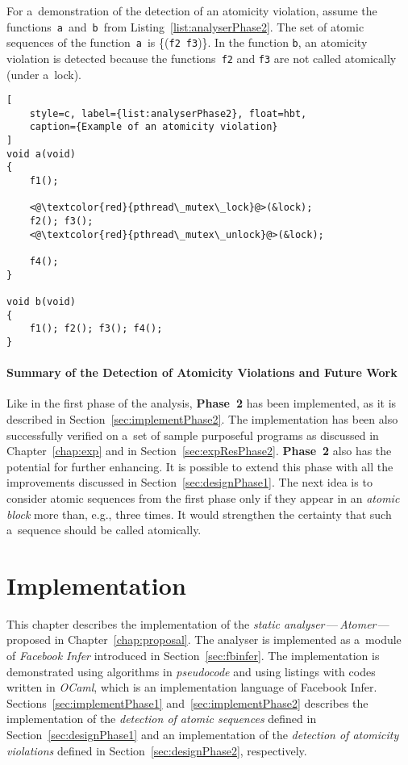 \begin{example}
    For a~demonstration of the detection of an atomicity violation, assume
    the functions~\texttt{a}~and~\texttt{b}~from
    Listing~\ref{list:analyserPhase2}. The set of atomic sequences of the
    function~\texttt{a}~is \{(\texttt{f2}~\texttt{f3})\}. In the function
    \texttt{b}, an atomicity violation is detected because the
    functions~\texttt{f2} and \texttt{f3} are not called atomically (under
    a~lock).
\end{example}

\begin{lstlisting}[
    style=c, label={list:analyserPhase2}, float=hbt,
    caption={Example of an atomicity violation}
]
void a(void)
{
    f1();

    <@\textcolor{red}{pthread\_mutex\_lock}@>(&lock);
    f2(); f3();
    <@\textcolor{red}{pthread\_mutex\_unlock}@>(&lock);

    f4();
}

void b(void)
{
    f1(); f2(); f3(); f4();
}
\end{lstlisting}

\subsubsection{%
    Summary of the Detection of Atomicity Violations and Future Work
}

Like in the first phase of the analysis, \textbf{Phase~2} has been
implemented, as it is described in Section~\ref{sec:implementPhase2}.
The implementation has been also successfully verified on a~set of
sample purposeful programs as discussed in Chapter~\ref{chap:exp} and in
Section~\ref{sec:expResPhase2}. \textbf{Phase~2} also has the potential for
further enhancing. It is possible to extend this phase with all the
improvements discussed in Section~\ref{sec:designPhase1}. The next idea
is to consider atomic sequences from the first phase only if they appear
in an \emph{atomic block} more than, e.g., three times. It would strengthen
the certainty that such a~sequence should be called atomically.



\chapter{Implementation}
\label{chap:implement}

This chapter describes the implementation of the \emph{static
analyser}\,---\,\emph{Atomer}\,---\,proposed in Chapter~\ref{chap:proposal}.
The analyser is implemented as a~module of \emph{Facebook Infer} introduced
in Section~\ref{sec:fbinfer}. The implementation is demonstrated using
algorithms in \emph{pseudocode} and using listings with codes written
in \emph{OCaml}, which is an implementation language of Facebook Infer.
Sections~\ref{sec:implementPhase1} and~\ref{sec:implementPhase2}
describes the implementation of the \emph{detection of atomic sequences}
defined in Section~\ref{sec:designPhase1} and an implementation of the
\emph{detection of atomicity violations} defined in
Section~\ref{sec:designPhase2}, respectively.

